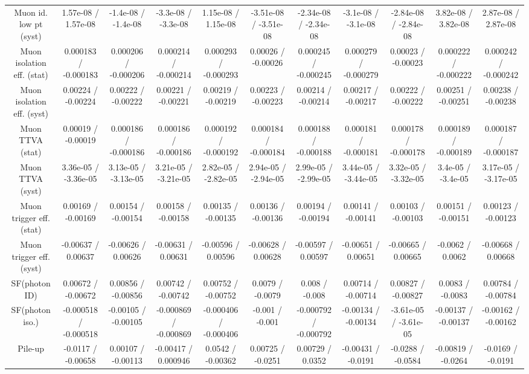 \begin{table}[htbp]
\begin{center}
\begin{tabular}{|c|c|c|c|c|c|c|c|c|c|c|}
  Muon id. low pt (syst) & 1.57e-08 / 1.57e-08 & -1.4e-08 / -1.4e-08 & -3.3e-08 / -3.3e-08 & 1.15e-08 / 1.15e-08 & -3.51e-08 / -3.51e-08 & -2.34e-08 / -2.34e-08 & -3.1e-08 / -3.1e-08 & -2.84e-08 / -2.84e-08 & 3.82e-08 / 3.82e-08 & 2.87e-08 / 2.87e-08 \\ 
  Muon isolation eff. (stat) & 0.000183 / -0.000183 & 0.000206 / -0.000206 & 0.000214 / -0.000214 & 0.000293 / -0.000293 & 0.00026 / -0.00026 & 0.000245 / -0.000245 & 0.000279 / -0.000279 & 0.00023 / -0.00023 & 0.000222 / -0.000222 & 0.000242 / -0.000242 \\ 
  Muon isolation eff. (syst) & 0.00224 / -0.00224 & 0.00222 / -0.00222 & 0.00221 / -0.00221 & 0.00219 / -0.00219 & 0.00223 / -0.00223 & 0.00214 / -0.00214 & 0.00217 / -0.00217 & 0.00222 / -0.00222 & 0.00251 / -0.00251 & 0.00238 / -0.00238 \\ 
  Muon TTVA (stat) & 0.00019 / -0.00019 & 0.000186 / -0.000186 & 0.000186 / -0.000186 & 0.000192 / -0.000192 & 0.000184 / -0.000184 & 0.000188 / -0.000188 & 0.000181 / -0.000181 & 0.000178 / -0.000178 & 0.000189 / -0.000189 & 0.000187 / -0.000187 \\ 
  Muon TTVA (syst) & 3.36e-05 / -3.36e-05 & 3.13e-05 / -3.13e-05 & 3.21e-05 / -3.21e-05 & 2.82e-05 / -2.82e-05 & 2.94e-05 / -2.94e-05 & 2.99e-05 / -2.99e-05 & 3.44e-05 / -3.44e-05 & 3.32e-05 / -3.32e-05 & 3.4e-05 / -3.4e-05 & 3.17e-05 / -3.17e-05 \\ 
  Muon trigger eff. (stat) & 0.00169 / -0.00169 & 0.00154 / -0.00154 & 0.00158 / -0.00158 & 0.00135 / -0.00135 & 0.00136 / -0.00136 & 0.00194 / -0.00194 & 0.00141 / -0.00141 & 0.00103 / -0.00103 & 0.00151 / -0.00151 & 0.00123 / -0.00123 \\ 
  Muon trigger eff. (syst) & -0.00637 / 0.00637 & -0.00626 / 0.00626 & -0.00631 / 0.00631 & -0.00596 / 0.00596 & -0.00628 / 0.00628 & -0.00597 / 0.00597 & -0.00651 / 0.00651 & -0.00665 / 0.00665 & -0.0062 / 0.0062 & -0.00668 / 0.00668 \\ 
  SF(photon ID) & 0.00672 / -0.00672 & 0.00856 / -0.00856 & 0.00742 / -0.00742 & 0.00752 / -0.00752 & 0.0079 / -0.0079 & 0.008 / -0.008 & 0.00714 / -0.00714 & 0.00827 / -0.00827 & 0.0083 / -0.0083 & 0.00784 / -0.00784 \\ 
  SF(photon iso.) & -0.000518 / -0.000518 & -0.00105 / -0.00105 & -0.000869 / -0.000869 & -0.000406 / -0.000406 & -0.001 / -0.001 & -0.000792 / -0.000792 & -0.00134 / -0.00134 & -3.61e-05 / -3.61e-05 & -0.00137 / -0.00137 & -0.00162 / -0.00162 \\ 
  Pile-up & -0.0117 / -0.00658 & 0.00107 / -0.00113 & -0.00417 / 0.000946 & 0.0542 / -0.00362 & 0.00725 / -0.0251 & 0.00729 / 0.0352 & -0.00431 / -0.0191 & -0.0288 / -0.0584 & -0.00819 / -0.0264 & -0.0169 / -0.0191 \\ 

\end{tabular}
\end{center}
\end{table}
